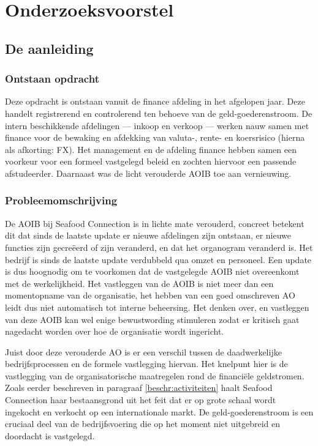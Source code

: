 \chapter{Onderzoeksvoorstel}
\section{De aanleiding}

\subsection{Ontstaan opdracht}
Deze opdracht is ontstaan vanuit de finance afdeling in het afgelopen jaar. Deze handelt registrerend en controlerend ten behoeve van de geld-goederenstroom. De intern beschikkende afdelingen –-- inkoop en verkoop --– werken nauw samen met finance voor de bewaking en afdekking van valuta-, rente- en koersrisico (hierna als afkorting: FX). Het management en de afdeling finance hebben samen een voorkeur voor een formeel vastgelegd beleid en zochten hiervoor een passende afstudeerder. Daarnaast was de licht verouderde AOIB toe aan vernieuwing.

\subsection{Probleemomschrijving} \label{beschr:problemen}
De AOIB bij Seafood Connection is in lichte mate verouderd, concreet betekent dit dat sinds de laatste update er nieuwe afdelingen zijn ontstaan, er nieuwe functies zijn gecreëerd of zijn veranderd, en dat het organogram veranderd is. Het bedrijf is sinds de laatste update verdubbeld qua omzet en personeel. Een update is dus hoognodig om te voorkomen dat de vastgelegde AOIB niet overeenkomt met de werkelijkheid. 
Het vastleggen van de AOIB is niet meer dan een momentopname van de organisatie, het hebben van een goed omschreven AO leidt dus niet automatisch tot interne beheersing. Het denken over, en vastleggen van deze AOIB kan wel enige bewustwording stimuleren zodat er kritisch gaat nagedacht worden over hoe de organisatie wordt ingericht. \citep{bivpraktijk}

Juist door deze verouderde AO is er een verschil tussen de daadwerkelijke bedrijfsprocessen en de formele vastlegging hiervan. Het knelpunt hier is de vastlegging van de organisatorische maatregelen rond de financiële geldstromen. Zoals eerder beschreven in paragraaf \ref{beschr:activiteiten} haalt Seafood Connection haar bestaansgrond uit het feit dat er op grote schaal wordt ingekocht en verkocht op een internationale markt. De geld-goederenstroom is een cruciaal deel van de bedrijfsvoering die op het moment niet uitgebreid en doordacht is vastgelegd. \citep{aoibsfc}

